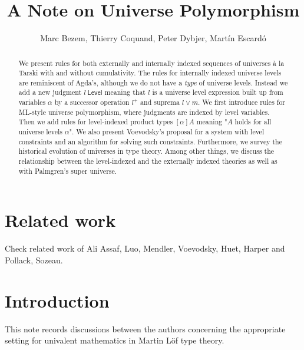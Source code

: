 \documentclass[11pt,a4paper]{article}
\def\Level{\mathsf{Level}}
\begin{document}
\title{A Note on Universe Polymorphism}

\author{Marc Bezem, Thierry Coquand, Peter Dybjer, Mart\'in Escard\'o}
\date{}
\maketitle

\begin{abstract}
We present rules for both externally and internally indexed sequences of universes \`a la Tarski with and without cumulativity. The rules for internally indexed universe levels are reminiscent of Agda's, although we do not have a {\em type} of universe levels. Instead we add a new judgment $l\ \Level$ meaning that $l$ is a universe level expression built up from variables $\alpha$ by a successor operation $l^+$ and suprema $l \vee m$. We first introduce rules for ML-style universe polymorphism, where judgments are indexed by level variables. Then we add rules for level-indexed product types $[\alpha]A$ meaning "$A$ holds for all universe levels $\alpha$". We also present Voevodsky's proposal for a system with level constraints and an algorithm for solving such constraints. Furthermore, we survey the historical evolution of universes in type theory. Among other things, we discuss the relationship between the level-indexed and the externally indexed theories as well as with Palmgren's super universe.
\end{abstract}

\section*{Related work}

Check related work of Ali Assaf, Luo, Mendler, Voevodsky, Huet, Harper and Pollack, Sozeau.

\section{Introduction}

This note records discussions between the authors concerning the appropriate setting for univalent mathematics in Martin Löf type theory.
\end{document}
